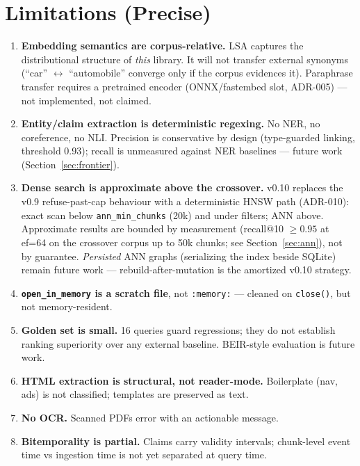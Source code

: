 
\needspace{0.2\textheight}
\section{Limitations (Precise)}\label{sec:limitations}

\begin{enumerate}[itemsep=3pt]
\item \textbf{Embedding semantics are corpus-relative.}
LSA captures the distributional structure of \emph{this} library. It will not
transfer external synonyms (``car'' $\leftrightarrow$ ``automobile'' converge
only if the corpus evidences it). Paraphrase transfer requires a pretrained
encoder (ONNX/fastembed slot, ADR-005) --- not implemented, not claimed.
\item \textbf{Entity/claim extraction is deterministic regexing.}
No NER, no coreference, no NLI. Precision is conservative by design
(type-guarded linking, threshold 0.93); recall is unmeasured against NER
baselines --- future work (Section~\ref{sec:frontier}).
\item \textbf{Dense search is approximate above the crossover.}
v0.10 replaces the v0.9 refuse-past-cap behaviour with a deterministic HNSW
path \cite{malkov2018} (ADR-010): exact scan below \texttt{ann\_min\_chunks}
(20k) and under filters; ANN above. Approximate results are bounded by
measurement (recall@10 $\geq 0.95$ at ef=64 on the crossover corpus up to 50k
chunks; see Section~\ref{sec:ann}), not by guarantee. \emph{Persisted} ANN
graphs (serializing the index beside SQLite) remain future work ---
rebuild-after-mutation is the amortized v0.10 strategy.
\item \textbf{\texttt{open\_in\_memory} is a scratch file}, not
\texttt{:memory:} --- cleaned on \texttt{close()}, but not memory-resident.
\item \textbf{Golden set is small.}
16 queries guard regressions; they do not establish ranking superiority over
any external baseline. BEIR-style evaluation is future work.
\item \textbf{HTML extraction is structural, not reader-mode.} Boilerplate
(nav, ads) is not classified; templates are preserved as text.
\item \textbf{No OCR.} Scanned PDFs error with an actionable message.
\item \textbf{Bitemporality is partial.} Claims carry validity intervals;
chunk-level event time vs ingestion time is not yet separated at query time.
\end{enumerate}

